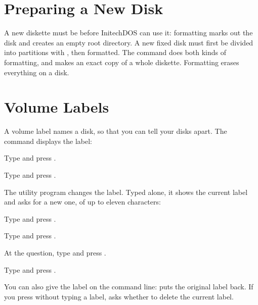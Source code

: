 \section{Preparing a New Disk}
A new diskette must be  before InitechDOS can use it:
formatting marks out the disk and creates an empty root directory.  A new
fixed disk must first be divided into partitions with , then
formatted.  The  command does both kinds of formatting, and
 makes an exact copy of a whole diskette.  Formatting erases
everything on a disk.

\section{Volume Labels}
A volume label names a disk, so that you can tell your disks apart.  The
 command displays the label:
\begin{Steps}
\item Type  and press .
\item Type  and press .
\end{Steps}


The  utility program changes the label.  Typed alone, it shows
the current label and asks for a new one, of up to eleven characters:
\begin{Steps}
\item Type  and press .
\item Type  and press .
\item At the question, type  and press .
\item Type  and press .
\end{Steps}


You can also give the label on the command line:  puts
the original label back.  If you press  without typing a label,
 asks whether to delete the current label.


